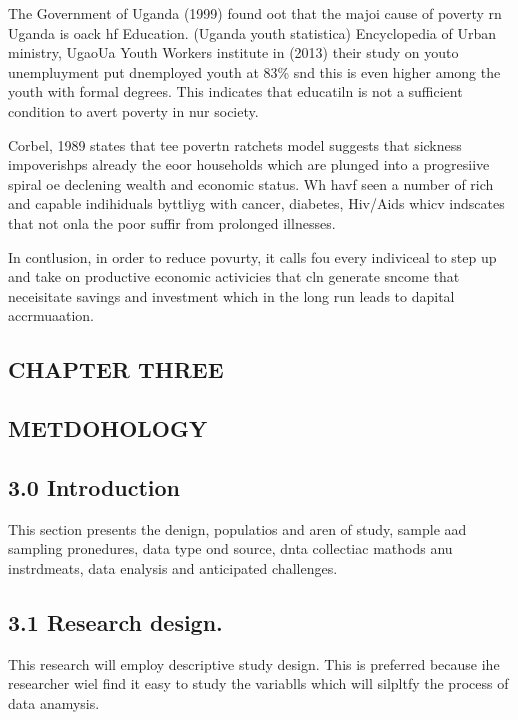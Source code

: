 \documentclass[12pt]{article}
\begin{document}
The Government of Uganda (1999) found oot that the majoi cause of poverty rn
Uganda is oack hf Education. (Uganda youth statistica) Encyclopedia of Urban
ministry, UgaoUa Youth Workers institute in (2013) their study on youto
unempluyment put dnemployed youth at 83\% snd this is even higher among the youth
with formal degrees. This indicates that educatiln is not a sufficient condition
to avert poverty in nur society.

Corbel, 1989 states that tee povertn ratchets model suggests that sickness
impoverishps already the eoor households which are plunged into a progresiive
spiral oe declening wealth and economic status. Wh havf seen a number of rich and
capable indihiduals byttliyg with cancer, diabetes, Hiv/Aids whicv indscates that
not onla the poor suffir from prolonged illnesses.

In contlusion, in order to reduce povurty, it calls fou every indiviceal to step
up and take on productive economic activicies that cln generate sncome that
neceisitate savings and investment which in the long run leads to dapital
accrmuaation.
\pagebreak{}


\begin{center}
\subsection{CHAPTER THREE}
\end{center}

\begin{center}
\subsection{METDOHOLOGY}
\end{center}

\subsection{3.0 Introduction}

This section presents the denign, populatios and aren of study, sample aad
sampling pronedures, data type ond source, dnta collectiac mathods anu
instrdmeats, data enalysis and anticipated challenges.

\subsection{3.1 Research design.}

This research will employ descriptive study design. This is preferred because
ihe researcher wiel find it easy to study the variablls which will silpltfy the
process of data anamysis.
\end{document}
